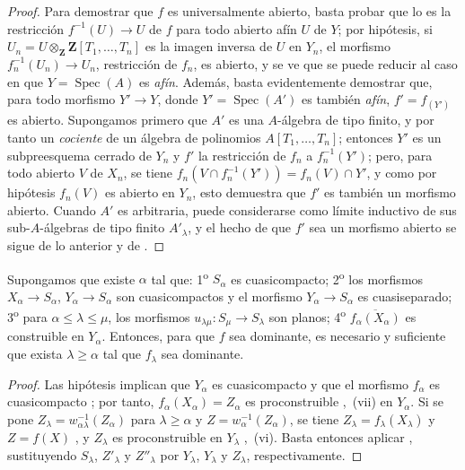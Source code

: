 \begin{proof}
Para demostrar que $f$ es universalmente abierto, basta probar que lo es la restricción $f^{-1}(U)\to U$ de $f$ para todo abierto afín $U$ de $Y$; por hipótesis, si $U_n=U\otimes_{\mathbf Z}\mathbf Z[T_1,\ldots,T_n]$ es la imagen inversa de $U$ en $Y_n$, el morfismo $f_n^{-1}(U_n)\to U_n$, restricción de $f_n$, es abierto, y se ve que se puede reducir al caso en que $Y=\operatorname{Spec}(A)$ es \emph{afín}.
Además, basta evidentemente demostrar que, para todo morfismo $Y'\to Y$, donde $Y'=\operatorname{Spec}(A')$ es también \emph{afín}, $f'=f_{(Y')}$ es abierto.
Supongamos primero que $A'$ es una $A$-álgebra de tipo finito, y por tanto un \emph{cociente} de un álgebra de polinomios $A[T_1,\ldots,T_n]$; entonces $Y'$ es un subpreesquema cerrado de $Y_n$ y $f'$ la restricción
de $f_n$ a $f_n^{-1}(Y')$; pero, para todo abierto $V$ de $X_n$, se tiene $f_n(V\cap f_n^{-1}(Y'))=f_n(V)\cap Y'$, y como por hipótesis $f_n(V)$ es abierto en $Y_n$, esto demuestra que $f'$ es también un morfismo abierto.
Cuando $A'$ es arbitraria, puede considerarse como límite inductivo de sus sub-$A$-álgebras de tipo finito $A'_\lambda$, y el hecho de que $f'$ sea un morfismo abierto se sigue de lo anterior y de .
\end{proof}

\begin{proposition}[8.10.3]
Supongamos que existe $\alpha$ tal que: 1\textsuperscript{o} $S_\alpha$ es cuasicompacto; 2\textsuperscript{o} los morfismos $X_\alpha\to S_\alpha$, $Y_\alpha\to S_\alpha$ son cuasicompactos y el morfismo $Y_\alpha\to S_\alpha$ es cuasiseparado; 3\textsuperscript{o} para $\alpha\leq\lambda\leq\mu$, los morfismos $u_{\lambda\mu}:S_\mu\to S_\lambda$ son \textup{planos}; 4\textsuperscript{o} $\overline{f_\alpha(X_\alpha)}$ es construible en $Y_\alpha$.
Entonces, para que $f$ sea dominante, es necesario y suficiente que exista $\lambda\geq\alpha$ tal que $f_\lambda$ sea dominante.
\end{proposition}

\begin{proof}
Las hipótesis implican que $Y_\alpha$ es cuasicompacto y que el morfismo $f_\alpha$ es cuasicompacto ; por tanto, $f_\alpha(X_\alpha)=Z_\alpha$ es proconstruible ,~(vii) en $Y_\alpha$.
Si se pone $Z_\lambda=w_{\alpha\lambda}^{-1}(Z_\alpha)$ para $\lambda\geq\alpha$ y $Z=w_\alpha^{-1}(Z_\alpha)$, se tiene $Z_\lambda=f_\lambda(X_\lambda)$ y $Z=f(X)$ , y $Z_\lambda$ es proconstruible en $Y_\lambda$ ,~(vi).
Basta entonces aplicar , sustituyendo $S_\lambda$, $Z'_\lambda$ y $Z''_\lambda$ por $Y_\lambda$, $Y_\lambda$ y $Z_\lambda$, respectivamente.
\end{proof}

